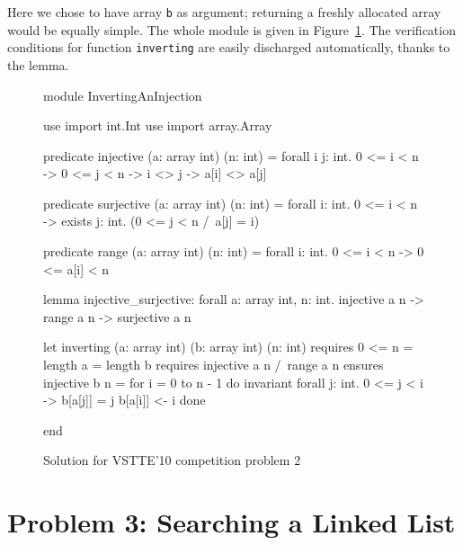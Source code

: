 Here we chose to have array \texttt{b} as argument; returning a
freshly allocated array would be equally simple.
The whole module is given in Figure~\ref{fig:Inverting}.
The verification conditions for function \texttt{inverting} are easily
discharged automatically, thanks to the lemma.
\begin{figure}
  \centering
\begin{whycode}
module InvertingAnInjection

  use import int.Int
  use import array.Array

  predicate injective (a: array int) (n: int) =
    forall i j: int. 0 <= i < n -> 0 <= j < n -> i <> j -> a[i] <> a[j]

  predicate surjective (a: array int) (n: int) =
    forall i: int. 0 <= i < n -> exists j: int. (0 <= j < n /\ a[j] = i)

  predicate range (a: array int) (n: int) =
    forall i: int. 0 <= i < n -> 0 <= a[i] < n

  lemma injective_surjective:
    forall a: array int, n: int.
      injective a n -> range a n -> surjective a n

  let inverting (a: array int) (b: array int) (n: int)
    requires { 0 <= n = length a = length b }
    requires { injective a n /\ range a n }
    ensures  { injective b n }
  = for i = 0 to n - 1 do
      invariant { forall j: int. 0 <= j < i -> b[a[j]] = j }
      b[a[i]] <- i
    done

end
\end{whycode}
\vspace*{-1em}%
  \caption{Solution for VSTTE'10 competition problem 2}
  \label{fig:Inverting}
\end{figure}

\section{Problem 3: Searching a Linked List}

